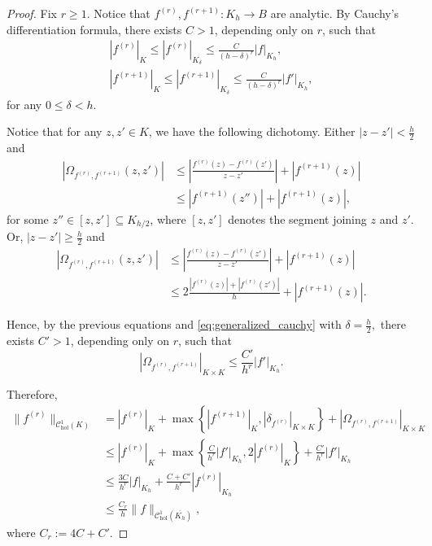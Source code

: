 \documentclass[10pt]{article}
\begin{document}
\begin{proof}
Fix $r \geq 1$. Notice that $f^{(r)}, f^{(r + 1)}: K_h \to B$ are analytic. By Cauchy's differentiation formula, there exists $C > 1$, depending only on $r$, such that 
\begin{equation}
\label{eq:generalized_cauchy}
\begin{aligned}
|f^{(r)}|_{K} \leq |f^{(r)}|_{K_\delta} \leq \frac{C}{(h - \delta)^r} | f|_{K_h}, \\
|f^{(r + 1)}|_{K} \leq |f^{(r + 1)}|_{K_\delta} \leq \frac{C}{(h - \delta)^r} | f'|_{K_h},
\end{aligned}
\end{equation}
for any $0 \leq \delta < h$.

Notice that for any $z, z' \in K$, we have the following dichotomy. Either $|z - z'| < \tfrac{h}{2}$ and
\begin{align*} |\Omega_{f^{(r)}, f^{(r + 1)}}(z, z')| & \leq \left| \frac{f^{(r)}(z) - f^{(r)}(z')}{z - z'} \right| + |f^{(r + 1)}(z)|\\& \leq |f^{(r + 1)}(z'')| + |f^{(r + 1)}(z)|, 
\end{align*}
for some $z'' \in [z, z'] \subseteq K_{h/2}$, where $[z, z']$ denotes the segment joining $z$ and $z'$. Or, $|z - z'| \geq \tfrac{h}{2}$ and
\begin{align*} |\Omega_{f^{(r)}, f^{(r + 1)}}(z, z')| & \leq \left| \frac{f^{(r)}(z) - f^{(r)}(z')}{z - z'} \right| + |f^{(r + 1)}(z)| \\ & \leq 2\frac{|f^{(r)}(z)| + |f^{(r)}(z')|}{h} + |f^{(r + 1)}(z)|. 
\end{align*}

Hence, by the previous equations and \eqref{eq:generalized_cauchy} with $\delta = \tfrac{h}{2},$ there exists $C' > 1$, depending only on $r$, such that
\[ | \Omega_{f^{(r)}, f^{(r + 1)}}|_{K \times K} \leq \frac{C'}{h^r} | f'|_{K_h}.\]


Therefore,
\begin{align*}
\|f^{(r)}\|_{\mathscr C^1_{\text{hol}}(K)} &= |f^{(r)}|_K + \max \left\{ |f^{(r + 1)}|_K, |\delta_{f^{(r)}}|_{K \times K} \right\} + | \Omega_{f^{(r)}, f^{(r + 1)}}|_{K \times K} \\
& \leq |f^{(r)}|_K + \max \left\{ \tfrac{C}{h^r}|f'|_{K_h}, 2|f^{(r)}|_{K} \right\} + \tfrac{C'}{h^r} | f'|_{K_h} \\
& \leq \tfrac{3C}{h^r}|f|_{K_h} +\tfrac{C + C'}{h^r} | f^{(r)}|_{K_h} \\
& \leq \tfrac{C_r}{h} \|f\|_{\mathscr C^1_{\text{hol}}(\overline{K_h})},
\end{align*}
where $C_r := 4C + C'$.
\end{proof}
\end{document}
